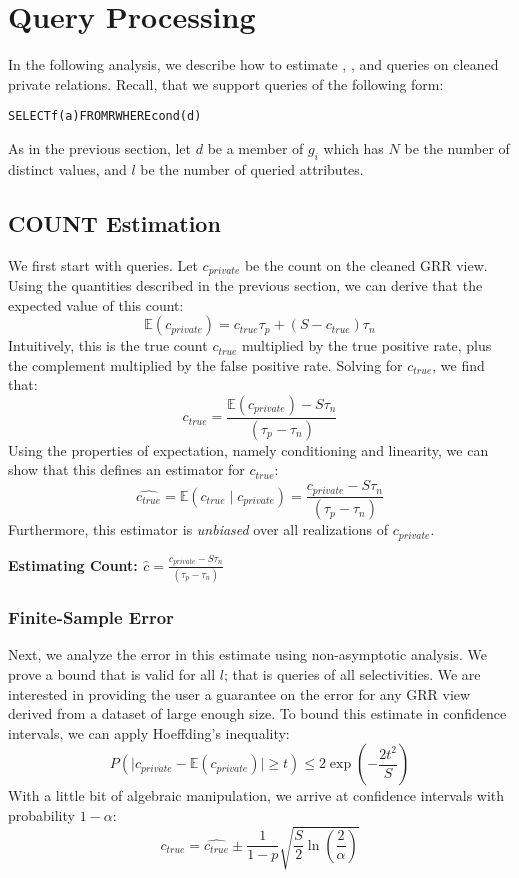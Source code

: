 \section{Query Processing}
In the following analysis, we describe how to estimate \sumfunc, \avgfunc, and \countfunc
queries on cleaned private relations. 
Recall, that we support queries of the following form:
\begin{alltt}
SELECT \textsf{f}(a) FROM R WHERE cond(d)
\end{alltt}
As in the previous section, let $d$ be a member of $g_i$ which has $N$ be the number of distinct values, and $l$ be the number of queried attributes.

\subsection{COUNT Estimation}
We first start with \countfunc queries.
Let $c_{private}$ be the count on the cleaned GRR view.
Using the quantities described in the previous section, we can derive that the expected value of this count:
\[
\mathbb{E}(c_{private})=c_{true}\tau_p+(S-c_{true})\tau_n
\]
Intuitively, this is the true count $c_{true}$ multiplied by the true positive rate, plus the complement multiplied by the false positive rate.
Solving for $c_{true}$, we find that:
\[ c_{true} = \frac{\mathbb{E}(c_{private})-S\tau_n}{(\tau_p-\tau_n)} \] 
Using the properties of expectation, namely conditioning and linearity, we can show that this defines an estimator for $c_{true}$: 
\[ \widehat{c_{true}} = \mathbb{E}(c_{true} \mid c_{private}) = \frac{c_{private}-S\tau_n}{(\tau_p-\tau_n)} \] 
Furthermore, this estimator is \emph{unbiased} over all realizations of $c_{private}$.

\vspace{0.5em}

\noindent\textbf{Estimating Count: \textmd{$\hat{c}=\frac{c_{private}-S\tau_n}{(\tau_p-\tau_n)}$}}


\subsubsection{Finite-Sample Error}
Next, we analyze the error in this estimate using non-asymptotic analysis.
We prove a bound that is valid for all $l$; that is queries of all selectivities.
We are interested in providing the user a guarantee on the error for any GRR view derived from a dataset of large enough size.
To bound this estimate in confidence intervals, we can apply Hoeffding's inequality:
\[
P(\mid c_{private}-\mathbb{E}(c_{private})\mid\ge t)\le2\exp(-\frac{2t^{2}}{S})
\]
With a little bit of algebraic manipulation, we arrive at confidence intervals with probability $1-\alpha$:
\[
c_{true}=\widehat{c_{true}}\pm\frac{1}{1-p}\sqrt{\frac{S}{2}\ln(\frac{2}{\alpha})}
\]

